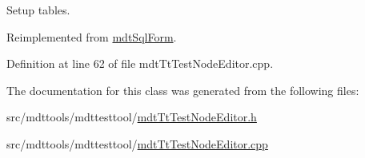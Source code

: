 Setup tables. 



Reimplemented from \hyperlink{classmdt_sql_form_a27fe6e45aa5d4d7782aad9833e6de20b}{mdt\-Sql\-Form}.



Definition at line 62 of file mdt\-Tt\-Test\-Node\-Editor.\-cpp.



The documentation for this class was generated from the following files\-:\begin{DoxyCompactItemize}
\item 
src/mdttools/mdttesttool/\hyperlink{mdt_tt_test_node_editor_8h}{mdt\-Tt\-Test\-Node\-Editor.\-h}\item 
src/mdttools/mdttesttool/\hyperlink{mdt_tt_test_node_editor_8cpp}{mdt\-Tt\-Test\-Node\-Editor.\-cpp}\end{DoxyCompactItemize}
